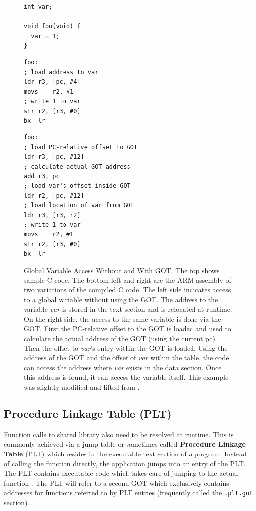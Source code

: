 \documentclass[12pt]{ucsddissertation}
\begin{document}
\begin{figure}
\begin{verbatim}
int var;
 
void foo(void) {
  var = 1;
}
\end{verbatim}
\centering
 \begin{minipage}{0.45\textwidth}
    \begin{verbatim}
foo:
; load address to var
ldr r3, [pc, #4] 
movs    r2, #1
; write 1 to var
str r2, [r3, #0] 
bx  lr
    \end{verbatim}
 \end{minipage}
 \begin{minipage}{0.45\textwidth}
\begin{verbatim}
foo:
; load PC-relative offset to GOT
ldr r3, [pc, #12]
; calculate actual GOT address 
add r3, pc
; load var's offset inside GOT
ldr r2, [pc, #12]
; load location of var from GOT
ldr r3, [r3, r2]
; write 1 to var
movs    r2, #1
str r2, [r3, #0]
bx  lr
\end{verbatim}
 \end{minipage}
    \caption[Global Variable Access with GOT]{Global Variable Access Without and With GOT. The top shows sample C code. The bottom left and right are the ARM assembly of two variations of the compiled C code. The left side indicates access to a global variable without using the GOT. The address to the variable \textit{var} is stored in the text section and is relocated at runtime. On the right side, the access to the same variable is done via the GOT. First the PC-relative offset to the GOT is loaded and used to calculate the actual address of the GOT (using the current pc). Then the offset to \textit{var}'s entry within the GOT is loaded. Using the address of the GOT and the offset of \textit{var} within the table, the code can access the address where \textit{var} exists in the data section. Once this address is found, it can access the variable itself. This example was slightly modified and lifted from \cite{mcu}.}
    \label{fig:gotpc}
\end{figure}


\subsection{Procedure Linkage Table (PLT)} \label{bg-plt}
Function calls to shared library also need to be resolved at runtime. This is commonly achieved via a jump table or sometimes called \textbf{Procedure Linkage Table} (PLT) which resides in the executable text section of a program. Instead of calling the function directly, the application jumps into an entry of the PLT. The PLT contains executable code which takes care of jumping to the actual function \cite{eli-pic}. The PLT will refer to a second GOT which exclusively contains addresses for functions referred to by PLT entries (frequently called the \texttt{.plt.got} section) \cite{lwm-dynamic}.
\end{document}
